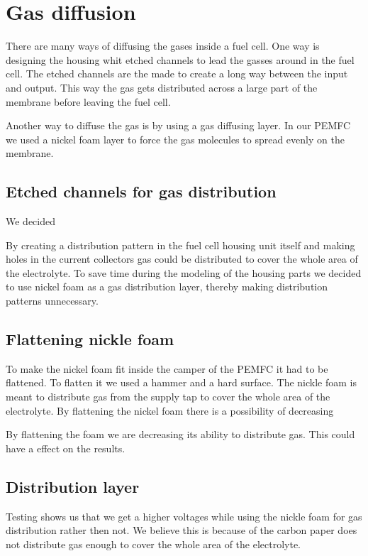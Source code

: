 \section{Gas diffusion}

There are many ways of diffusing the gases inside a fuel cell. One way is designing the housing whit etched channels 
to lead the gasses around in the fuel cell. The etched channels are the made to create a long way between the input and output. This way the gas gets distributed across a large part of the membrane before leaving the fuel cell. 

Another way to diffuse the gas is by using a gas diffusing layer. In our PEMFC we used a nickel foam layer to force the gas molecules to spread evenly on the membrane. 

\subsection{Etched channels for gas distribution}

We decided

By creating a distribution pattern in the fuel cell housing unit itself and making holes in the current collectors gas could be distributed to cover the whole area of the electrolyte. To save time during the modeling of the housing parts we decided to use nickel foam as a gas distribution layer, thereby making distribution patterns unnecessary.

\subsection{Flattening nickle foam}

To make the nickel foam fit inside the camper of the PEMFC it had to be flattened. To flatten it we used a hammer and a hard surface. The nickle foam is meant to distribute gas from the supply tap to cover the whole area of the electrolyte. By flattening the nickel foam there is a possibility of decreasing 

By flattening the foam we are decreasing its ability to distribute gas. This could have a effect on the results.  

\subsection{Distribution layer}

Testing shows us that we get a higher voltages while using the nickle foam for gas distribution rather then not. We believe this is because of the carbon paper does not distribute gas enough to cover the whole area of the electrolyte.    

